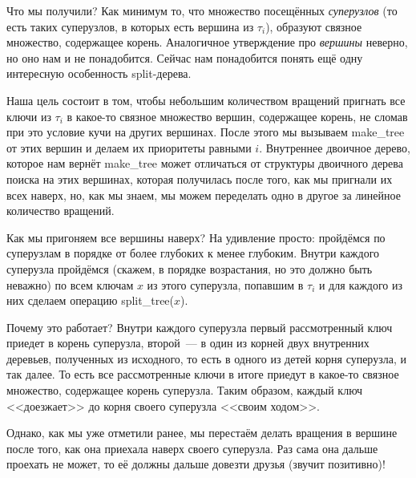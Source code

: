 Что мы получили? Как минимум то, что множество посещённых \emph{суперузлов} (то есть таких суперузлов, в которых есть вершина из $\tau_i$), образуют связное множество, содержащее корень. Аналогичное утверждение про \emph{вершины} неверно, но оно нам и не понадобится. Сейчас нам понадобится понять ещё одну интересную особенность split-дерева.

Наша цель состоит в том, чтобы небольшим количеством вращений пригнать все
ключи из $\tau_i$ в какое-то связное множество вершин, содержащее корень,
не сломав при это условие кучи на других вершинах.
После этого мы вызываем \textrm{make\_tree} от этих вершин и делаем их приоритеты
равными $i$. Внутреннее двоичное дерево, которое нам вернёт \textrm{make\_tree}
может отличаться от структуры двоичного дерева поиска на этих вершинах, которая получилась после того, как мы пригнали их всех наверх, но, как мы знаем, мы можем переделать одно в другое за линейное количество вращений.

Как мы пригоняем все вершины наверх? На удивление просто: пройдёмся по суперузлам в порядке от более глубоких к менее глубоким. Внутри каждого суперузла пройдёмся (скажем, в порядке возрастания, но это должно быть неважно) по всем ключам $x$ из этого суперузла, попавшим в $\tau_i$ и для каждого из них сделаем операцию
\textrm{split\_tree}($x$).

Почему это работает? Внутри каждого суперузла первый рассмотренный ключ приедет в корень суперузла, второй~--- в один из корней двух внутренних деревьев, полученных из исходного, то есть в одного из детей корня суперузла, и так далее. То есть все рассмотренные ключи в итоге приедут в какое-то связное множество, содержащее корень суперузла. Таким образом, каждый ключ <<доезжает>> до корня своего суперузла <<своим ходом>>.

Однако, как мы уже отметили ранее, мы перестаём делать вращения в вершине после того, как она приехала наверх своего суперузла. Раз сама она дальше проехать не может, то её должны
дальше довезти друзья (звучит позитивно)!


